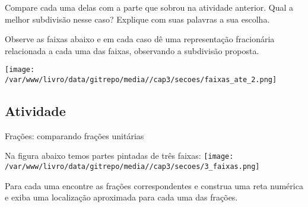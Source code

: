 \documentclass[a4,12pt]{book}
\begin{document}
Compare cada uma delas com a parte que sobrou na atividade anterior.  
Qual a melhor subdivisão nesse caso?
Explique com suas palavras a sua escolha.

Observe as faixas abaixo e em cada caso dê uma representação fracionária relacionada a cada uma das faixas, observando a subdivisão proposta.

\texttt{[image: /var/www/livro/data/gitrepo/media//cap3/secoes/faixas\_ate\_2.png]}

\subsection{Atividade}

Frações: comparando frações unitárias

Na figura abaixo temos partes pintadas de três faixas:
\texttt{[image: /var/www/livro/data/gitrepo/media//cap3/secoes/3\_faixas.png]}

Para cada uma encontre as frações correspondentes e construa uma reta numérica e exiba uma localização aproximada para cada uma das frações.
\end{document}

